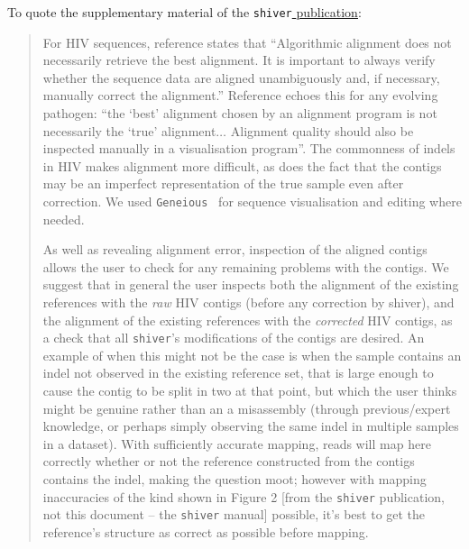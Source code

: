 \documentclass{article}
\newcommand{\shiv}{\c{shiver}\xspace}
\let\c\texttt
\newcommand{\www}{\color{blue} \underline}
\begin{document}
To quote the supplementary material of the \shiv \href{https://doi.org/10.1093/ve/vey007}{\www{publication}}:

\begin{quotation}
For HIV sequences, reference \cite{AlignmentReview} states that ``Algorithmic alignment does not necessarily retrieve the best alignment.
It is important to always verify whether the sequence data are aligned unambiguously and, if necessary, manually correct the alignment.''
Reference \cite{McElroy2014} echoes this for any evolving pathogen: ``the `best' alignment chosen by an alignment program is not necessarily the `true' alignment$\ldots$ Alignment quality should also be inspected manually in a visualisation program''.
The commonness of indels in HIV makes alignment more difficult, as does the fact that the contigs may be an imperfect representation of the true sample even after correction.
We used \texttt{Geneious}~\cite{Geneious} for sequence visualisation and editing where needed.

As well as revealing alignment error, inspection of the aligned contigs allows the user to check for any remaining 
problems with the contigs.
We suggest that in general the user inspects both the alignment of the existing references with the {\it raw} HIV contigs (before any correction by shiver), and the alignment of the existing references with the {\it corrected} HIV contigs, as a check that all \shiv's modifications of the contigs are desired.
An example of when this might not be the case is when the sample contains an indel not observed in the existing reference set, that is large enough to cause the contig to be split in two at that point, but which the user thinks might be genuine rather than an a misassembly (through previous/expert knowledge, or perhaps simply observing the same indel in multiple samples in a dataset).
With sufficiently accurate mapping, reads will map here correctly whether or not the reference constructed from the contigs contains the indel, making the question moot; however with mapping inaccuracies of the kind shown in Figure 2 [from the \shiv publication, not this document -- the \shiv manual] possible, it's best to get the reference's structure as correct as possible before mapping.
\end{quotation}
\end{document}
